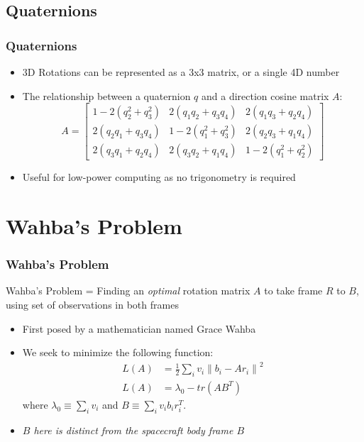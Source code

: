 \documentclass[11pt]{beamer}
\begin{document}
    \subsection{Quaternions}\label{subsec:quaternions}
    \begin{frame}
        \frametitle{Quaternions}
        \begin{itemize}[<+->]
            \item 3D Rotations can be represented as a 3x3 matrix, or a single 4D number \medskip
            \item The relationship between a quaternion $q$ and a direction cosine matrix $A$:
            \begin{equation}
                A =
                \begin{bmatrix}
                    1 - 2(q_2^2 + q_3^2) & 2(q_1 q_2 + q_3 q_4) & 2(q_1 q_3 + q_2 q_4) \\
                    2(q_2 q_1 + q_3 q_4) & 1-2(q_1^2+q_3^2) & 2(q_2 q_3 + q_1 q_4) \\
                    2(q_3 q_1 + q_2 q_4) & 2(q_3 q_2 + q_1 q_4) & 1 - 2(q_1^2+q_2^2)
                \end{bmatrix}
            \end{equation}
            \item Useful for low-power computing as no trigonometry is required
        \end{itemize}
    \end{frame}

    \section{Wahba's Problem}\label{sec:wahbasProblem}
    \begin{frame}
        \frametitle{Wahba's Problem}
        \begin{definition}
            Wahba's Problem = Finding an \textit{optimal} rotation matrix $A$ to take frame $R$ to $B$, using set of
            observations in both frames
        \end{definition} \medskip

        \begin{itemize}[<+->]
            \item First posed by a mathematician named Grace Wahba \medskip
            \item We seek to minimize the following function:
            \begin{align}
                L(A) &= \frac{1}{2} \sum_i v_i \left\|  b_i - Ar_i \right\|^2 \\
                L(A) &= \lambda_0 - \mathit{tr}\left(AB^T\right)
            \end{align}
            where $\lambda_0 \equiv \sum_i v_i$ and $B \equiv \sum_i v_i b_i r_i^T$. \medskip
            \item \textit{$B$ here is distinct from the spacecraft body frame $B$}
        \end{itemize}
    \end{frame}
\end{document}
